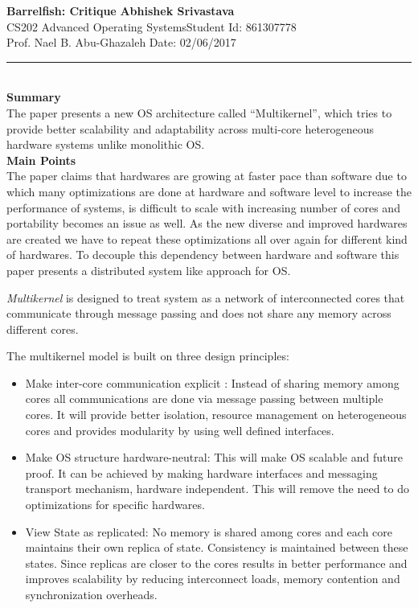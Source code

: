 \documentclass[a4paper, 10pt]{article}
\begin{document}
\noindent
\large\textbf{Barrelfish: Critique} \hfill \textbf{Abhishek Srivastava} \\
\normalsize CS202 Advanced Operating Systems\hfill Student Id: 861307778 \\
Prof. Nael B. Abu-Ghazaleh \hfill Date: 02/06/2017 \\
\hrule

\noindent
\\
\large\textbf{Summary}\\
The paper presents a new OS architecture called ``Multikernel'', which tries to provide better scalability and adaptability across multi-core heterogeneous hardware systems unlike monolithic OS.\\

\noindent
\large\textbf{Main Points}\\
The paper claims that hardwares are growing at faster pace than software due to which many optimizations are done at hardware and software level to increase the performance of systems, is difficult to scale with increasing number of cores and portability becomes an issue as well. As the new diverse and improved hardwares are created we have to repeat these optimizations all over again for different kind of hardwares. To decouple this dependency between hardware and software this paper presents a distributed system like approach for OS. 

\emph{Multikernel} is designed to treat system as a network of interconnected cores that communicate through message passing and does not share any memory across different cores.

The multikernel model is built on three design principles:
\begin{itemize}
	\item Make inter-core communication explicit : Instead of sharing memory among cores all communications are done via message passing between multiple cores. It will provide better isolation, resource management on heterogeneous cores and provides modularity by using well defined interfaces. 
	\item Make OS structure hardware-neutral: This will make OS scalable and future proof. It can be achieved by making  hardware interfaces and messaging transport mechanism, hardware independent. This will remove the need to do optimizations for specific hardwares.
	\item View State as replicated: No memory is shared among cores and each core maintains their own replica of state. Consistency is maintained between these states. Since replicas are closer to the cores results in better performance and improves scalability by reducing interconnect loads, memory contention and synchronization overheads. 
\end{itemize}
\end{document}
